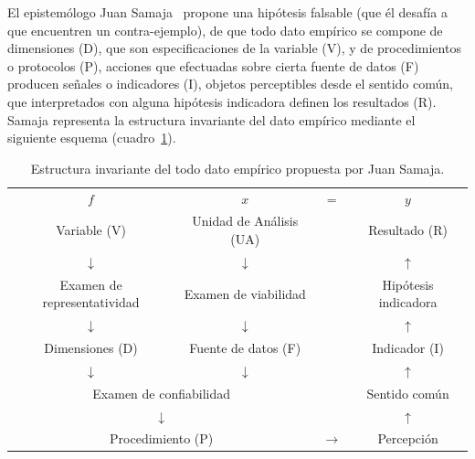 \documentclass[a4paper,11pt]{book}
\theoremstyle{definition}
\begin{document}


El epistem\'ologo Juan Samaja~\cite{Samaja1999} propone una hip\'otesis falsable (que \'el desaf\'ia a que encuentren un contra-ejemplo), de que todo dato emp\'irico se compone de dimensiones (D), que son especificaciones de la variable (V), y de procedimientos o protocolos (P), acciones que efectuadas sobre cierta fuente de datos (F) producen se\~nales o indicadores (I), objetos perceptibles desde el sentido com\'un, que interpretados con alguna hip\'otesis indicadora definen los resultados (R).
%
Samaja representa la estructura invariante del dato emp\'irico mediante el siguiente esquema (cuadro~\ref{tab:matriz_datos}).
%
\begin{table}[ht!]
\centering \footnotesize
\begin{tabular}{cccc}
$f$ & \normalsize $x$ &\normalsize  = & $y$    \\
  \normalsize  Variable (V) & \normalsize  Unidad de An\'alisis (UA) &\normalsize   &\normalsize  Resultado (R)    \\ \hline
 $\downarrow$ &$\downarrow$&&$\uparrow$ \\
 Examen de representatividad &Examen de viabilidad & & Hip\'otesis indicadora \\
 $\downarrow$ &$\downarrow$&&$\uparrow$ \\
 \normalsize Dimensiones (D) & \normalsize Fuente de datos (F) &  & \normalsize Indicador (I) \\
 $\downarrow$ &$\downarrow$&&$\uparrow$ \\
 \multicolumn{2}{c}{Examen de confiabilidad} & & Sentido com\'un \\
 \multicolumn{2}{c}{$\downarrow$} & &$\uparrow$ \\
 \multicolumn{2}{c}{\normalsize Procedimiento (P)} & $\rightarrow$ & \normalsize Percepci\'on \\
\end{tabular}
\caption{Estructura invariante del todo dato emp\'irico propuesta por Juan Samaja.}
\label{tab:matriz_datos}
\end{table}

\end{document}
